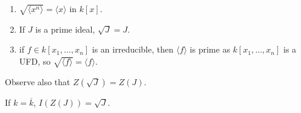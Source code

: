 \documentclass{article}
\begin{document}
\begin{eg}
    \leavevmode
    \begin{enumerate}[label=(\arabic*)]
        \item $\sqrt{\langle x^n \rangle} = \langle x \rangle$ in $k[x]$.
        \item If $J$ is a prime ideal, $\sqrt{J} = J$.
        \item if $f \in k[x_1, \dotsc, x_n]$ is an irreducible, then $\langle f \rangle$ is prime as $k[x_1, \dotsc, x_n]$ is a UFD, so $\sqrt{ \langle f \rangle} = \langle f \rangle$.
    \end{enumerate}
\end{eg}
Observe also that $Z(\sqrt{J}) = Z(J)$.
\begin{thm}
    If $k = \overline{k}$, $I(Z(J)) = \sqrt{J}$.
\end{thm}
\end{document}
